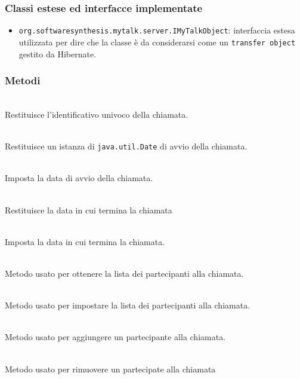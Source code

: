\subsubsection*{Classi estese ed interfacce implementate}

\begin{itemize}
	\item \texttt{org.softwaresynthesis.mytalk.server.IMyTalkObject}: interfaccia estesa utilizzata per dire che la classe è da considerarsi come un \texttt{transfer object} gestito da Hibernate.
\end{itemize}

\subsubsection*{Metodi}
\begin{description}
	\item{}\\
	Restituisce l'identificativo univoco della chiamata.
	\item{}\\
	Restituisce un istanza di \texttt{java.util.Date} di avvio della chiamata.
	\item{}\\
	Imposta la data di avvio della chiamata.
	\item{}\\
	Restituisce la data in cui termina la chiamata
	\item{}\\
	Imposta la data in cui termina la chiamata.
	\item{}\\
	Metodo usato per ottenere la lista dei partecipanti alla chiamata.
	\item{}\\
	Metodo usato per impostare la lista dei partecipanti alla chiamata.
	\item{}\\
	Metodo usato per aggiungere un partecipante alla chiamata.
	\item{}\\
	Metodo usato per rimuovere un partecipate alla chiamata 
\end{description}

